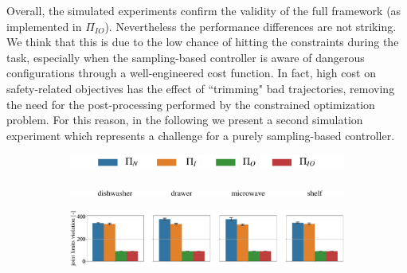 Overall, the simulated experiments confirm the validity of the full framework (as implemented in $\Pi_{IO}$). Nevertheless the performance differences are not striking. We think that this is due to the low chance of hitting the constraints during the task, especially when the sampling-based controller is aware of dangerous configurations through a well-engineered cost function. In fact, high cost on safety-related objectives has the effect of ``trimming" bad trajectories, removing the need for the post-processing performed by the constrained optimization problem. For this reason, in the following we present a second simulation experiment which represents a challenge for a purely sampling-based controller. 

\begin{figure}[t]
\begin{subfigure}{1\columnwidth}
    \includegraphics[width=\linewidth]{figures/methods_comparison/legend.pdf}
\end{subfigure}%
\hfill
\begin{subfigure}{\columnwidth}
    \includegraphics[width=\linewidth]{figures/methods_comparison/object_types.pdf}
\end{subfigure}%
\hfill
\hspace*{-0.2cm}
\vspace*{0.1cm}
\begin{subfigure}{\columnwidth}
    \includegraphics[width=\linewidth]{figures/methods_comparison/joint_limits.pdf}
\end{subfigure}%
\hfill
\hspace*{-0.2cm}
\vspace*{0.1cm}

\end{figure}
